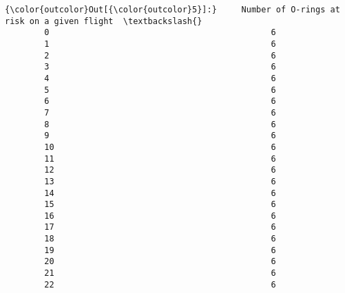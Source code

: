 \documentclass[11pt]{article}
\begin{document}
\begin{Verbatim}[commandchars=\\\{\}]
{\color{outcolor}Out[{\color{outcolor}5}]:}     Number of O-rings at risk on a given flight  \textbackslash{}
        0                                             6   
        1                                             6   
        2                                             6   
        3                                             6   
        4                                             6   
        5                                             6   
        6                                             6   
        7                                             6   
        8                                             6   
        9                                             6   
        10                                            6   
        11                                            6   
        12                                            6   
        13                                            6   
        14                                            6   
        15                                            6   
        16                                            6   
        17                                            6   
        18                                            6   
        19                                            6   
        20                                            6   
        21                                            6   
        22                                            6   
        

\end{Verbatim}
\end{document}
